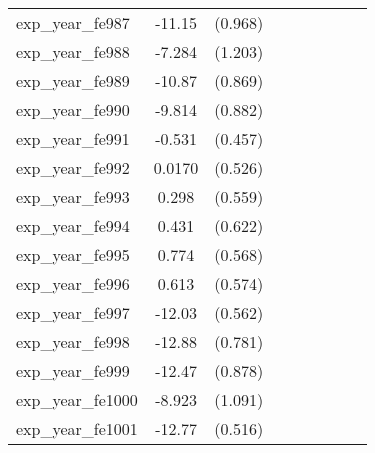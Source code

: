 {\begin{tabular}{l*{4}{cc}}
exp\_year\_fe987&   -11.15\sym{***}&  (0.968)&                  &         &                  &         &                  &         \\
exp\_year\_fe988&   -7.284\sym{***}&  (1.203)&                  &         &                  &         &                  &         \\
exp\_year\_fe989&   -10.87\sym{***}&  (0.869)&                  &         &                  &         &                  &         \\
exp\_year\_fe990&   -9.814\sym{***}&  (0.882)&                  &         &                  &         &                  &         \\
exp\_year\_fe991&   -0.531         &  (0.457)&                  &         &                  &         &                  &         \\
exp\_year\_fe992&   0.0170         &  (0.526)&                  &         &                  &         &                  &         \\
exp\_year\_fe993&    0.298         &  (0.559)&                  &         &                  &         &                  &         \\
exp\_year\_fe994&    0.431         &  (0.622)&                  &         &                  &         &                  &         \\
exp\_year\_fe995&    0.774         &  (0.568)&                  &         &                  &         &                  &         \\
exp\_year\_fe996&    0.613         &  (0.574)&                  &         &                  &         &                  &         \\
exp\_year\_fe997&   -12.03\sym{***}&  (0.562)&                  &         &                  &         &                  &         \\
exp\_year\_fe998&   -12.88\sym{***}&  (0.781)&                  &         &                  &         &                  &         \\
exp\_year\_fe999&   -12.47\sym{***}&  (0.878)&                  &         &                  &         &                  &         \\
exp\_year\_fe1000&   -8.923\sym{***}&  (1.091)&                  &         &                  &         &                  &         \\
exp\_year\_fe1001&   -12.77\sym{***}&  (0.516)&                  &         &                  &         &                  &         \\

\end{tabular}}
